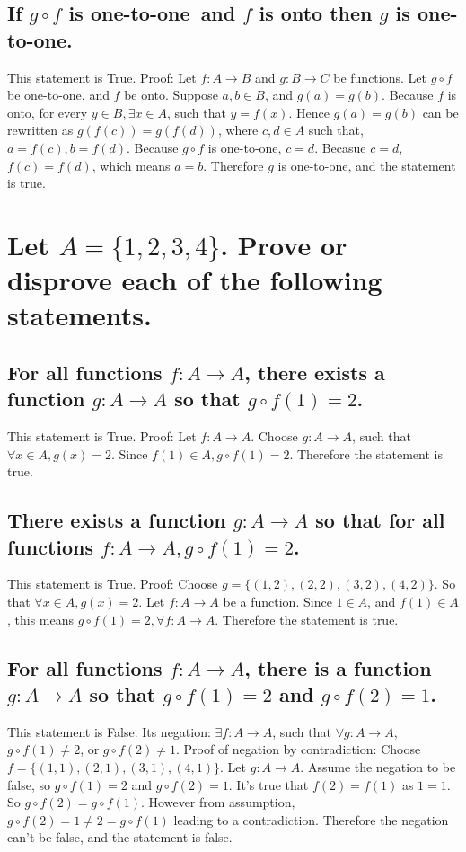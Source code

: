 \documentclass[10pt, letterpaper, titlepage]{article}
\newcommand{\0}{\varnothing}
\newcommand{\1}{\{ 1 \}}
\newcommand{\2}{\{ (1,1) \}}
\newcommand{\OTO}{one-to-one}
\newcommand{\gof}{g \circ f}
\begin{document}
        \subsection{If $\gof$ is \OTO \ and $f$ is onto then $g$ is \OTO.}
            This statement is True.
            Proof:
            Let $f : A \to B$ and $g : B \to C$ be functions.
            Let $\gof$ be \OTO, and $f$ be onto.
            Suppose $a, b \in B$, and $g(a) = g(b)$.
            Because $f$ is onto, for every $y \in B, \exists x \in A$, such that $y = f(x)$.
            Hence $g(a) = g(b)$ can be rewritten as $g(f(c)) = g(f(d))$, where $c, d \in A$ such that, $a = f(c), b = f(d)$.
            Because $\gof$ is \OTO, $c = d$.
            Becasue $c = d$, $f(c) = f(d)$, which means $a = b$.
            Therefore $g$ is \OTO, and the statement is true.

    \section{Let $A = \{ 1,2,3,4 \}$. Prove or disprove each of the following statements.}
        \subsection{For all functions $f: A \to A$, there exists a function $g : A \to A$ so that $\gof(1) = 2$.}
            This statement is True.
            Proof:
            Let $f: A \to A$.
            Choose $g: A \to A$, such that $\forall x \in A, g(x) = 2$.
            Since $f(1) \in A, \gof(1) = 2$.
            Therefore the statement is true.

        \subsection{There exists a function $g: A \to A$ so that for all functions $f: A \to A, \gof(1) = 2$.}
            This statement is True.
            Proof:
            Choose $g = \{ (1,2), (2,2), (3,2), (4,2) \}$.
            So that $\forall x \in A, g(x) = 2$.
            Let $f: A \to A$ be a function.
            Since $1 \in A$, and $f(1) \in A$, this means $\gof(1) = 2, \forall f:A \to A$.
            Therefore the statement is true.

        \subsection{For all functions $f: A \to A$, there is a function $g: A \to A$ so that $\gof(1) = 2$ and $\gof(2) = 1$.}
            This statement is False.
            Its negation: $\exists f: A \to A$, such that $\forall g: A \to A$, $\gof(1) \neq 2$, or $\gof(2) \neq 1$.
            Proof of negation by contradiction:
            Choose $f = \{ (1,1), (2,1), (3,1), (4,1) \}$.
            Let $g: A \to A$.
            Assume the negation to be false, so $\gof(1) = 2$ and $\gof(2) = 1.$
            It's true that $f(2) = f(1)$ as $1 = 1$.
            So $\gof(2) = \gof(1)$.
            However from assumption, $\gof(2) = 1 \neq 2 = \gof(1)$ leading to a contradiction.
            Therefore the negation can't be false, and the statement is false.
\end{document}
